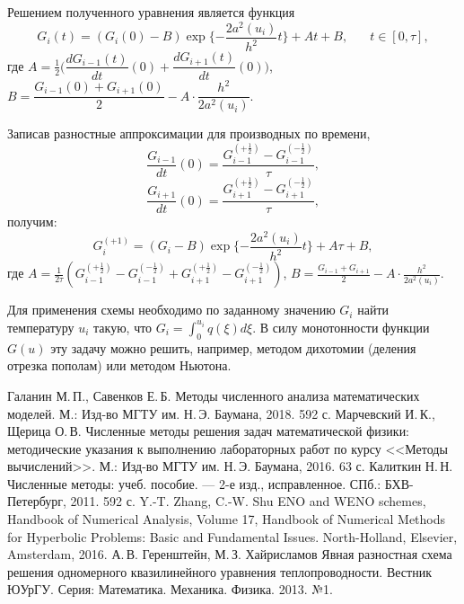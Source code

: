 \documentclass[12pt, a4paper]{article}
\begin{document}
	Решением полученного уравнения является функция
	\[
		G_i(t) = (G_i(0)-B) \exp\{-\frac{2a^2(u_i)}{h^2}t\} + At + B, \phantom{xxx} t\in [0, \tau],
	\]
	где $A=\frac12 \big(\dfrac{dG_{i-1}(t)}{dt}(0)+\dfrac{dG_{i+1}(t)}{dt}(0)\big)$,
	\mbox{$B = \dfrac{G_{i-1}(0)+G_{i+1}(0)}{2}-A\cdot \dfrac{h^2}{2a^2(u_i)}$}.
	
	Записав разностные аппроксимации для производных по времени, 
	\[
	\dfrac{G_{i-1}}{dt}(0) = \frac{G_{i-1}^{(+\frac{1}{2})}-G_{i-1}^{(-\frac{1}{2})}}{\tau},
	\]
	\[
	\dfrac{G_{i+1}}{dt}(0) = \frac{G_{i+1}^{(+\frac{1}{2})}-G_{i+1}^{(-\frac{1}{2})}}{\tau},
	\]
	получим:
	\[
	G_i^{(+1)} = (G_i - B)\exp\{-\frac{2a^2(u_i)}{h^2}t\} + A\tau +B,
	\]
	где $A = \frac{1}{2\tau}(G_{i-1}^{(+\frac12)}  - G_{i-1}^{(-\frac12)} + G_{i+1}^{(+\frac12)} - G_{i+1}^{(-\frac12)})$, 
	\mbox{$B=\frac{G_{i-1}+G_{i+1}}{2} - A\cdot \frac{h^2}{2a^2(u_i)}$}.
	
	Для применения схемы необходимо по заданному значению $G_i$ найти температуру $u_i$ такую, что $G_i = \int_{0}^{u_i}q(\xi)d\xi$. В силу монотонности функции $G(u)$ эту задачу можно решить, например, методом дихотомии (деления отрезка пополам) или методом Ньютона.
	\clearpage
	\begin{thebibliography}{9}
		 Галанин М.\,П., Савенков Е.\,Б. Методы численного анализа математических моделей. М.: Изд-во МГТУ им. Н.\,Э. Баумана, 2018. 592 с.
		 Марчевский И.\,К., Щерица О.\,В. Численные методы решения задач математической физики: методические указания к выполнению лабораторных работ по курсу <<Методы вычислений>>. М.: Изд-во МГТУ им. Н.\,Э. Баумана, 2016. 63 с.
		 Калиткин Н.\,Н.
		Численные методы: учеб. пособие. —
		2-е изд., исправленное. СПб.: БХВ-Петербург, 2011. 
		592 с. 
		  Y.-T. Zhang, C.-W. Shu ENO and WENO schemes, Handbook of Numerical Analysis, Volume 17, Handbook of Numerical Methods for Hyperbolic Problems: Basic and Fundamental Issues. North-Holland, Elsevier, Amsterdam, 2016.
		 А.\,В. Геренштейн, М.\,З. Хайрисламов Явная разностная схема решения одномерного квазилинейного уравнения теплопроводности. Вестник ЮУрГУ. Серия: Математика. Механика. Физика. 2013. №1.
	\end{thebibliography}
	
\end{document}
